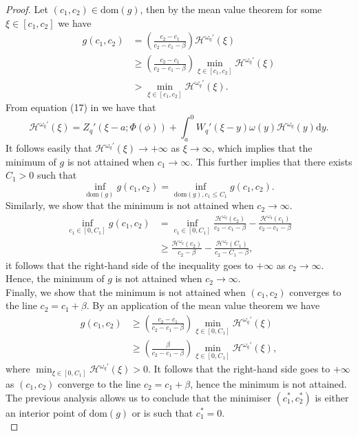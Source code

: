 \documentclass[11pt,reqno]{amsart}
\newcommand{\diff}{\mathrm{d}}
\newcommand{\cH}{\mathcal{H}}
\newcommand{\homega}{\omega_q}
\newcommand{\PAR}[1]{{{\left(#1\right)}}} %
\renewcommand{\leq}{\leqslant}
\renewcommand{\geq}{\geqslant}
\begin{document}
\begin{proof}
	Let $(c_1,c_2) \in \text{dom}(g)$, then by the mean value theorem for some $\xi \in [c_1,c_2]$ we have
	\begin{align*}
	g(c_1,c_2) &= \PAR{\frac{c_2-c_1}{c_2-c_1-\beta}} \cH^{\homega\prime}(\xi)\\
	&\geq \PAR{\frac{c_2-c_1}{c_2-c_1-\beta}} \min_{\xi \in [c_1,c_2]} \cH^{\homega\prime}(\xi)\\
	& > \min_{\xi \in [c_1,c_2]} \cH^{\homega\prime}(\xi).
	\end{align*}
	From equation (17) in \cite{mata-renaud_2024}we have that
	\[
	\cH^{\homega\prime}(\xi) = Z_q'(\xi-a;\Phi(\phi)) + \int_a^0 W_q'(\xi-y)\omega(y) \cH^{\homega}(y) \diff y.
	\] 
	It follows easily that $\cH^{\homega\prime}(\xi) \to +\infty$ as $\xi \to \infty$, which implies that the minimum of $g$ is not attained when $c_1 \to \infty$. This further implies that there exists $C_1 > 0$ such that
	\[
	\inf_{\text{dom}(g)} g(c_1,c_2) = \inf_{\text{dom}(g), c_1\leq C_1}g(c_1,c_2).
	\]
	Similarly, we show that the minimum is not attained when $c_2 \to \infty$.
	\begin{align*}
		\inf_{c_1 \in [0,C_1]}g(c_1,c_2) &= \inf_{c_1 \in [0,C_1]} \frac{\cH^{\homega}(c_2)}{c_2-c_1-\beta} - \frac{\cH^{\homega}(c_1)}{c_2-c_1-\beta} \\
		& \geq \frac{\cH^{\homega}(c_2)}{c_2-\beta} - \frac{\cH^{\homega}(C_1)}{c_2-C_1-\beta},
	\end{align*}
	it follows that the right-hand side of the inequality goes to $+\infty$ as $c_2 \to \infty$. Hence, the minimum of $g$ is not attained when $c_2 \to \infty$.\\
	Finally, we show that the minimum is not attained when $(c_1,c_2)$ converges to the line $c_2 = c_1 + \beta$. By an application of the mean value theorem we have
	\begin{align*}
		g(c_1,c_2) &\geq \PAR{\frac{c_2-c_1}{c_2-c_1-\beta}} \min_{\xi \in [0,C_1]}\cH^{\homega\prime}(\xi)\\
		&\geq \PAR{\frac{\beta}{c_2-c_1-\beta}} \min_{\xi \in [0,C_1]}\cH^{\homega\prime}(\xi),
	\end{align*}
	where $\min_{\xi \in [0,C_1]}\cH^{\homega\prime}(\xi)>0$. It follows that the right-hand side goes to $+\infty$ as $(c_1,c_2)$ converge to the line $c_2 = c_1 + \beta$, hence the minimum is not attained.\\
	The previous analysis allows us to conclude that the minimiser $(c_1^\ast,c_2^\ast)$ is either an interior point of $\text{dom}(g)$ or is such that $c_1^\ast = 0$.\\

\end{proof}
\end{document}
